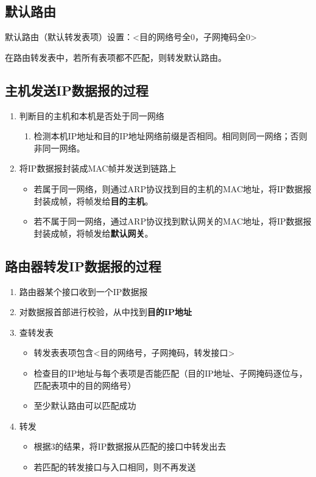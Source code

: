 \subsection{默认路由}
默认路由（默认转发表项）设置：<目的网络号全0，子网掩码全0>

在路由转发表中，若所有表项都不匹配，则转发默认路由。


\subsection{主机发送IP数据报的过程}
\begin{enumerate}
    \item 判断目的主机和本机是否处于同一网络\begin{enumerate}
        \item 检测本机IP地址和目的IP地址网络前缀是否相同。相同则同一网络；否则非同一网络。
    \end{enumerate}
    \item 将IP数据报封装成MAC帧并发送到链路上\begin{itemize}
        \item 若属于同一网络，则通过ARP协议找到目的主机的MAC地址，将IP数据报封装成帧，将帧发给\textbf{目的主机}。
        \item 若不属于同一网络，通过ARP协议找到默认网关的MAC地址，将IP数据报封装成帧，将帧发给\textbf{默认网关}。
    \end{itemize}
\end{enumerate}


\subsection{路由器转发IP数据报的过程}
\begin{enumerate}
    \item 路由器某个接口收到一个IP数据报
    \item 对数据报首部进行校验，从中找到\textbf{目的IP地址}
    \item 查转发表\begin{itemize}
        \item 转发表表项包含<目的网络号，子网掩码，转发接口>
        \item 检查目的IP地址与每个表项是否能匹配（目的IP地址、子网掩码逐位与，匹配表项中的目的网络号）
        \item 至少默认路由可以匹配成功
    \end{itemize}
    \item 转发\begin{itemize}
        \item 根据3的结果，将IP数据报从匹配的接口中转发出去
        \item 若匹配的转发接口与入口相同，则不再发送
    \end{itemize}
\end{enumerate}


